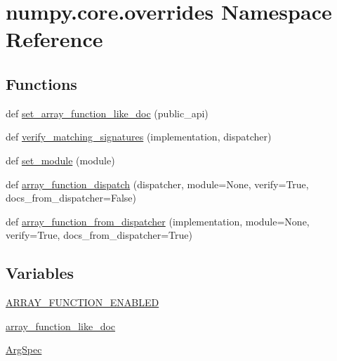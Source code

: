 \hypertarget{namespacenumpy_1_1core_1_1overrides}{}\section{numpy.\+core.\+overrides Namespace Reference}
\label{namespacenumpy_1_1core_1_1overrides}
\subsection*{Functions}
\begin{DoxyCompactItemize}
\item 
def \hyperlink{namespacenumpy_1_1core_1_1overrides_a993f5a8f781a2b8e83a52737349ed80f}{set\+\_\+array\+\_\+function\+\_\+like\+\_\+doc} (public\+\_\+api)
\item 
def \hyperlink{namespacenumpy_1_1core_1_1overrides_ab6b113a10534f8d0b1506da657c648af}{verify\+\_\+matching\+\_\+signatures} (implementation, dispatcher)
\item 
def \hyperlink{namespacenumpy_1_1core_1_1overrides_a6c5301f4b04cbf4f35da7bc9ed3f9c73}{set\+\_\+module} (module)
\item 
def \hyperlink{namespacenumpy_1_1core_1_1overrides_a1f1970e59f9a4e93ebdc06fcaaa3bb72}{array\+\_\+function\+\_\+dispatch} (dispatcher, module=None, verify=True, docs\+\_\+from\+\_\+dispatcher=False)
\item 
def \hyperlink{namespacenumpy_1_1core_1_1overrides_a6eac64f23de359be7b5239e457ce253c}{array\+\_\+function\+\_\+from\+\_\+dispatcher} (implementation, module=None, verify=True, docs\+\_\+from\+\_\+dispatcher=True)
\end{DoxyCompactItemize}
\subsection*{Variables}
\begin{DoxyCompactItemize}
\item 
\hyperlink{namespacenumpy_1_1core_1_1overrides_a6f0d38d03fb38e7da160a12049419fe1}{A\+R\+R\+A\+Y\+\_\+\+F\+U\+N\+C\+T\+I\+O\+N\+\_\+\+E\+N\+A\+B\+L\+ED}
\item 
\hyperlink{namespacenumpy_1_1core_1_1overrides_ac11b1b3bcfbf1f156c18c103abb17747}{array\+\_\+function\+\_\+like\+\_\+doc}
\item 
\hyperlink{namespacenumpy_1_1core_1_1overrides_a9253de10972f3734974a0a37adfa7cdd}{Arg\+Spec}
\end{DoxyCompactItemize}


